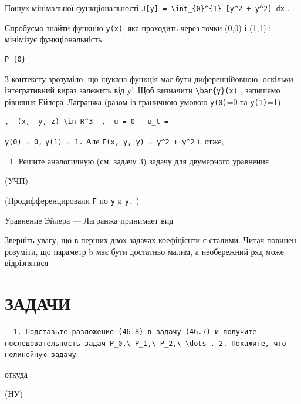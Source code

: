 \documentclass[
  ukrainian,
]{article}
\providecommand{\tightlist}{%
  \setlength{\itemsep}{0pt}\setlength{\parskip}{0pt}}
\begin{document}
Пошук мінімальної функціональності
\texttt{J{[}y{]}\ =\ \textbackslash{}int\_\{0\}\^{}\{1\}\ {[}y\^{}2\ +\ y\textquotesingle{}\^{}2{]}\ dx}
.

Спробуємо знайти функцію \texttt{y(x)}, яка проходить через точки (0,0)
і (1,1) і мінімізує функціональність

\begin{verbatim}
P_{0}
\end{verbatim}

З контексту зрозуміло, що шукана функція має бути диференційовною,
оскільки інтегративний вираз залежить від y'. Щоб визначити
\texttt{\textbackslash{}bar\{y\}(x)} , запишемо рівняння
Ейлера--Лагранжа (разом із граничною умовою \texttt{y(0)}=0 та
\texttt{y(1)}=1).

\begin{verbatim}
,  (x,  y, z) \in R^3  ,  u = 0   u_t =
\end{verbatim}

\texttt{y(0)\ =\ 0,} \texttt{y(1)\ =\ 1.} Але
\texttt{F(x,\ y,\ y\textquotesingle{})\ =\ y\^{}2\ +\ y\textquotesingle{}\^{}2}
і, отже,

\begin{enumerate}
\def\labelenumi{\arabic{enumi}.}
\setcounter{enumi}{3}
\tightlist
\item
  Решите аналогичную (см. задачу 3) задачу для двумерного уравнения
\end{enumerate}

(УЧП)

(Продифференцировали \texttt{F} по \texttt{y} и
\texttt{y\textquotesingle{}.} )

Уравнение Эйлера --- Лагранжа принимает вид

Зверніть увагу, що в перших двох задачах коефіцієнти є сталими. Читач
повинен розуміти, що параметр b має бути достатньо малим, а необережний
ряд може відрізнятися

\section{ЗАДАЧИ}\label{ux437ux430ux434ux430ux447ux438}

\begin{verbatim}
- 1. Подставьте разложение (46.8) в задачу (46.7) и получите последовательность задач P_0,\ P_1,\ P_2,\ \dots . 2. Покажите, что нелинейную задачу
\end{verbatim}

откуда

(НУ)
\end{document}
